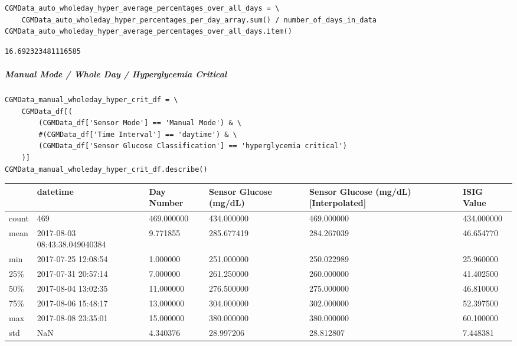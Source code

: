 \begin{verbatim}
CGMData_auto_wholeday_hyper_average_percentages_over_all_days = \
    CGMData_auto_wholeday_hyper_percentages_per_day_array.sum() / number_of_days_in_data
CGMData_auto_wholeday_hyper_average_percentages_over_all_days.item()
\end{verbatim}

\begin{verbatim}
16.692323481116585
\end{verbatim}

\subparagraph{Manual Mode / Whole Day / Hyperglycemia Critical}

\begin{verbatim}
CGMData_manual_wholeday_hyper_crit_df = \
    CGMData_df[(
        (CGMData_df['Sensor Mode'] == 'Manual Mode') & \
        #(CGMData_df['Time Interval'] == 'daytime') & \
        (CGMData_df['Sensor Glucose Classification'] == 'hyperglycemia critical')
    )]
CGMData_manual_wholeday_hyper_crit_df.describe()
\end{verbatim}

\bigskip\noindent
\begin{tabular}{p{}p{}p{}p{}p{}p{}}
\toprule
 & datetime & Day Number & Sensor Glucose (mg/dL) & Sensor Glucose (mg/dL) [Interpolated] & ISIG Value \\
\hline
count & 469 & 469.000000 & 434.000000 & 469.000000 & 434.000000 \\
\hline
mean & 2017-08-03 08:43:38.049040384 & 9.771855 & 285.677419 & 284.267039 & 46.654770 \\
\hline
min & 2017-07-25 12:08:54 & 1.000000 & 251.000000 & 250.022989 & 25.960000 \\
\hline
25\% & 2017-07-31 20:57:14 & 7.000000 & 261.250000 & 260.000000 & 41.402500 \\
\hline
50\% & 2017-08-04 13:02:35 & 11.000000 & 276.500000 & 275.000000 & 46.810000 \\
\hline
75\% & 2017-08-06 15:48:17 & 13.000000 & 304.000000 & 302.000000 & 52.397500 \\
\hline
max & 2017-08-08 23:35:01 & 15.000000 & 380.000000 & 380.000000 & 60.100000 \\
\hline
std & NaN & 4.340376 & 28.997206 & 28.812807 & 7.448381 \\
\hline
\bottomrule
\end{tabular}

